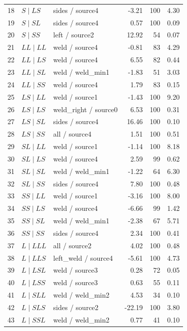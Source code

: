 \begin{longtable}{@{}r>{\raggedright\arraybackslash}p{.28\linewidth}>{\raggedright\arraybackslash}p{.27\linewidth}rrr@{}}
18 & $S\mid LS$ & sides / source4 & -3.21 & 100 & 4.30\\
19 & $S\mid SL$ & sides / source4 & 0.57 & 100 & 0.09\\
20 & $S\mid SS$ & left / source2 & 12.92 & 54 & 0.07\\
21 & $LL\mid LL$ & weld / source4 & -0.81 & 83 & 4.29\\
22 & $LL\mid LS$ & weld / source4 & 6.55 & 82 & 0.44\\
23 & $LL\mid SL$ & weld / weld\_\allowbreak min1 & -1.83 & 51 & 3.03\\
24 & $LL\mid SS$ & weld / source4 & 1.79 & 83 & 0.15\\
25 & $LS\mid LL$ & weld / source1 & -1.43 & 100 & 9.20\\
26 & $LS\mid LS$ & weld\_\allowbreak right / source0 & 6.53 & 100 & 0.31\\
27 & $LS\mid SL$ & sides / source4 & 16.46 & 100 & 0.10\\
28 & $LS\mid SS$ & all / source4 & 1.51 & 100 & 0.51\\
29 & $SL\mid LL$ & weld / source1 & -1.14 & 100 & 8.18\\
30 & $SL\mid LS$ & weld / source4 & 2.59 & 99 & 0.62\\
31 & $SL\mid SL$ & weld / weld\_\allowbreak min1 & -1.22 & 64 & 6.30\\
32 & $SL\mid SS$ & sides / source4 & 7.80 & 100 & 0.48\\
33 & $SS\mid LL$ & weld / source1 & -3.16 & 100 & 8.00\\
34 & $SS\mid LS$ & weld / source4 & -6.66 & 99 & 1.42\\
35 & $SS\mid SL$ & weld / weld\_\allowbreak min1 & -2.38 & 67 & 5.71\\
36 & $SS\mid SS$ & sides / source4 & 2.34 & 100 & 0.41\\
37 & $L\mid LLL$ & all / source2 & 4.02 & 100 & 0.48\\
38 & $L\mid LLS$ & left\_\allowbreak weld / source4 & -5.61 & 100 & 4.73\\
39 & $L\mid LSL$ & weld / source3 & 0.28 & 72 & 0.05\\
40 & $L\mid LSS$ & weld / source3 & 0.63 & 55 & 0.11\\
41 & $L\mid SLL$ & weld / weld\_\allowbreak min2 & 4.53 & 34 & 0.10\\
42 & $L\mid SLS$ & sides / source2 & -22.19 & 100 & 3.80\\
43 & $L\mid SSL$ & weld / weld\_\allowbreak min2 & 0.77 & 41 & 0.10\\

\end{longtable}
